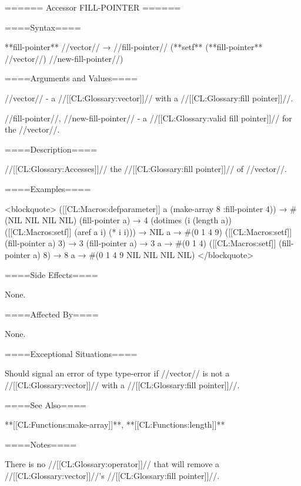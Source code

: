 ====== Accessor FILL-POINTER ======

====Syntax====

**fill-pointer** //vector// → //fill-pointer// (**setf** (**fill-pointer** //vector//) //new-fill-pointer//)

====Arguments and Values====

//vector// - a //[[CL:Glossary:vector]]// with a //[[CL:Glossary:fill pointer]]//.

//fill-pointer//, //new-fill-pointer// - a //[[CL:Glossary:valid fill pointer]]// for the //vector//.

====Description====

//[[CL:Glossary:Accesses]]// the //[[CL:Glossary:fill pointer]]// of //vector//.

====Examples====

<blockquote> ([[CL:Macros:defparameter]] a (make-array 8 :fill-pointer 4)) → #(NIL NIL NIL NIL) (fill-pointer a) → 4 (dotimes (i (length a)) ([[CL:Macros:setf]] (aref a i) (* i i))) → NIL a → #(0 1 4 9) ([[CL:Macros:setf]] (fill-pointer a) 3) → 3 (fill-pointer a) → 3 a → #(0 1 4) ([[CL:Macros:setf]] (fill-pointer a) 8) → 8 a → #(0 1 4 9 NIL NIL NIL NIL) </blockquote>

====Side Effects====

None.

====Affected By====

None.

====Exceptional Situations====

Should signal an error of type type-error if //vector// is not a //[[CL:Glossary:vector]]// with a //[[CL:Glossary:fill pointer]]//.

====See Also====

**[[CL:Functions:make-array]]**, **[[CL:Functions:length]]**

====Notes====

There is no //[[CL:Glossary:operator]]// that will remove a //[[CL:Glossary:vector]]//'s //[[CL:Glossary:fill pointer]]//.

